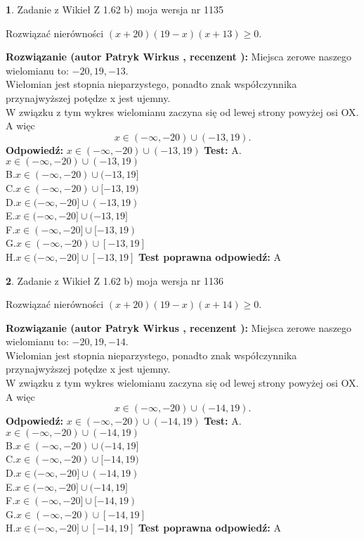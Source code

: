 \documentclass[12pt, a4paper]{article}
\theoremstyle{definition} %
\newtheorem{zad}{}
\newcommand{\zadStart}[1]{\begin{zad}#1\newline}
\newcommand{\zadStop}{\end{zad}}
\newcommand{\rozwStart}[2]{\noindent \textbf{Rozwiązanie (autor #1 , recenzent #2): }\newline}
\newcommand{\rozwStop}{\newline}
\newcommand{\odpStart}{\noindent \textbf{Odpowiedź:}\newline}
\newcommand{\odpStop}{\newline}
\newcommand{\testStart}{\noindent \textbf{Test:}\newline}
\newcommand{\testStop}{\newline}
\newcommand{\kluczStart}{\noindent \textbf{Test poprawna odpowiedź:}\newline}
\newcommand{\kluczStop}{\newline}
\begin{document}
\zadStart{Zadanie z Wikieł Z 1.62 b) moja wersja nr 1135}

Rozwiązać nierówności $(x+20)(19-x)(x+13)\ge0$.
\zadStop
\rozwStart{Patryk Wirkus}{}
Miejsca zerowe naszego wielomianu to: $-20, 19, -13$.\\
Wielomian jest stopnia nieparzystego, ponadto znak współczynnika przy\linebreak najwyższej potędze x jest ujemny.\\ W związku z tym wykres wielomianu zaczyna się od lewej strony powyżej osi OX. A więc $$x \in (-\infty,-20) \cup (-13,19).$$
\rozwStop
\odpStart
$x \in (-\infty,-20) \cup (-13,19)$
\odpStop
\testStart
A.$x \in (-\infty,-20) \cup (-13,19)$\\
B.$x \in (-\infty,-20) \cup (-13,19]$\\
C.$x \in (-\infty,-20) \cup [-13,19)$\\
D.$x \in (-\infty,-20] \cup (-13,19)$\\
E.$x \in (-\infty,-20] \cup (-13,19]$\\
F.$x \in (-\infty,-20] \cup [-13,19)$\\
G.$x \in (-\infty,-20) \cup [-13,19]$\\
H.$x \in (-\infty,-20] \cup [-13,19]$
\testStop
\kluczStart
A
\kluczStop



\zadStart{Zadanie z Wikieł Z 1.62 b) moja wersja nr 1136}

Rozwiązać nierówności $(x+20)(19-x)(x+14)\ge0$.
\zadStop
\rozwStart{Patryk Wirkus}{}
Miejsca zerowe naszego wielomianu to: $-20, 19, -14$.\\
Wielomian jest stopnia nieparzystego, ponadto znak współczynnika przy\linebreak najwyższej potędze x jest ujemny.\\ W związku z tym wykres wielomianu zaczyna się od lewej strony powyżej osi OX. A więc $$x \in (-\infty,-20) \cup (-14,19).$$
\rozwStop
\odpStart
$x \in (-\infty,-20) \cup (-14,19)$
\odpStop
\testStart
A.$x \in (-\infty,-20) \cup (-14,19)$\\
B.$x \in (-\infty,-20) \cup (-14,19]$\\
C.$x \in (-\infty,-20) \cup [-14,19)$\\
D.$x \in (-\infty,-20] \cup (-14,19)$\\
E.$x \in (-\infty,-20] \cup (-14,19]$\\
F.$x \in (-\infty,-20] \cup [-14,19)$\\
G.$x \in (-\infty,-20) \cup [-14,19]$\\
H.$x \in (-\infty,-20] \cup [-14,19]$
\testStop
\kluczStart
A
\kluczStop
\end{document}

